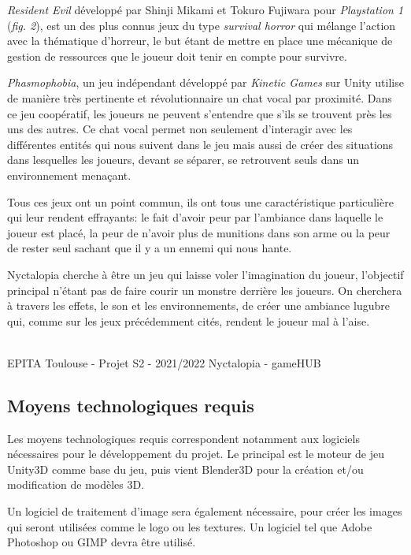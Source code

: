 \emph{Resident Evil} développé par Shinji Mikami et Tokuro Fujiwara pour \emph{Playstation 1} (\emph{fig. 2}), est un des plus connus jeux du type \emph{survival horror} qui mélange l'action avec la thématique d'horreur, le but étant de mettre en place une mécanique de gestion de ressources que le joueur doit tenir en compte pour survivre. 

\emph{Phasmophobia}, un jeu indépendant développé par \emph{Kinetic Games} sur Unity utilise de manière très pertinente et révolutionnaire un chat vocal par proximité. Dans ce jeu coopératif, les joueurs ne peuvent s'entendre que s'ils se trouvent près les uns des autres. Ce chat vocal permet non seulement d'interagir avec les différentes entités qui nous suivent dans le jeu mais aussi de créer des situations dans lesquelles les joueurs, devant se séparer, se retrouvent seuls dans un environnement menaçant.

Tous ces jeux ont un point commun, ils ont tous une caractéristique particulière qui leur rendent effrayants: le fait d'avoir peur par l'ambiance dans laquelle le joueur est placé, la peur de n'avoir plus de munitions dans son arme ou la peur de rester seul sachant que il y a un ennemi qui nous hante.

Nyctalopia cherche à être un jeu qui laisse voler l'imagination du joueur, l'objectif principal n'étant pas de faire courir un monstre derrière les joueurs. On cherchera à travers les effets, le son et les environnements, de créer une ambiance lugubre qui, comme sur les jeux précédemment cités, rendent le joueur mal à l'aise. 

\vfill
\noindent\makebox[\linewidth]{\rule{.8\paperwidth}{.6pt}}\\[0.2cm]
EPITA Toulouse - Projet S2 - 2021/2022 \hfill Nyctalopia - gameHUB
\noindent\makebox[\linewidth]{\rule{.8\paperwidth}{.6pt}}

\subsection{Moyens technologiques requis}
Les moyens technologiques requis correspondent notamment aux logiciels
nécessaires pour le développement du projet. Le principal est le moteur de jeu Unity3D comme base du jeu, puis vient Blender3D pour la création et/ou modification de modèles 3D. 

Un logiciel de traitement d’image sera également nécessaire, pour créer les images qui seront utilisées comme le logo ou les textures. Un logiciel tel que Adobe Photoshop ou GIMP devra être utilisé. 

